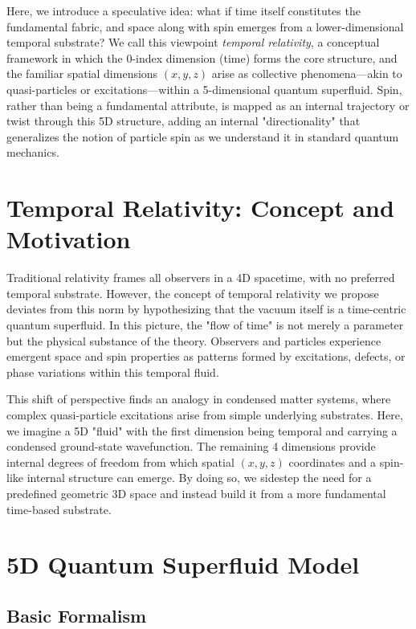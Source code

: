 \documentclass[aps,prd,twocolumn,showpacs,showkeys,superscriptaddress,amsmath,amssymb]{revtex4-2}
\begin{document}
Here, we introduce a speculative idea: what if time itself constitutes the fundamental fabric, and space along with spin emerges from a lower-dimensional temporal substrate? We call this viewpoint \emph{temporal relativity}, a conceptual framework in which the 0-index dimension (time) forms the core structure, and the familiar spatial dimensions $(x,y,z)$ arise as collective phenomena—akin to quasi-particles or excitations—within a 5-dimensional quantum superfluid. Spin, rather than being a fundamental attribute, is mapped as an internal trajectory or twist through this 5D structure, adding an internal "directionality" that generalizes the notion of particle spin as we understand it in standard quantum mechanics.

\section{Temporal Relativity: Concept and Motivation}

Traditional relativity frames all observers in a 4D spacetime, with no preferred temporal substrate. However, the concept of temporal relativity we propose deviates from this norm by hypothesizing that the vacuum itself is a time-centric quantum superfluid. In this picture, the "flow of time" is not merely a parameter but the physical substance of the theory. Observers and particles experience emergent space and spin properties as patterns formed by excitations, defects, or phase variations within this temporal fluid.

This shift of perspective finds an analogy in condensed matter systems, where complex quasi-particle excitations arise from simple underlying substrates. Here, we imagine a 5D "fluid" with the first dimension being temporal and carrying a condensed ground-state wavefunction. The remaining 4 dimensions provide internal degrees of freedom from which spatial $(x,y,z)$ coordinates and a spin-like internal structure can emerge. By doing so, we sidestep the need for a predefined geometric 3D space and instead build it from a more fundamental time-based substrate.

\section{5D Quantum Superfluid Model}

\subsection{Basic Formalism}
\end{document}
